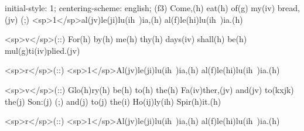 initial-style: 1;
centering-scheme: english;
(f3) Come,(h) eat(h) of(g) my(iv) bread,(jv) (;) <sp>1</sp>al(jv)le(ji)lu(ih~)ia,(h) al(f)le(hi)lu(ih~)ia.(h) 

<sp>v</sp>(::) For(h) by(h) me(h) thy(h) days(iv) shall(h) be(h) mul(g)ti(iv)plied.(jv)

<sp>r</sp>(::) <sp>1</sp>Al(jv)le(ji)lu(ih~)ia,(h) al(f)le(hi)lu(ih~)ia.(h) 

<sp>v</sp>(::) Glo(h)ry(h) be(h) to(h) the(h) Fa(iv)ther,(jv) and(jv) to(kxjk) the(j) Son:(j) (;) and(j) to(j) the(i) Ho(ij)ly(ih) Spir(h)it.(h)

<sp>r</sp>(::) <sp>1</sp>Al(jv)le(ji)lu(ih~)ia,(h) al(f)le(hi)lu(ih~)ia.(h) 